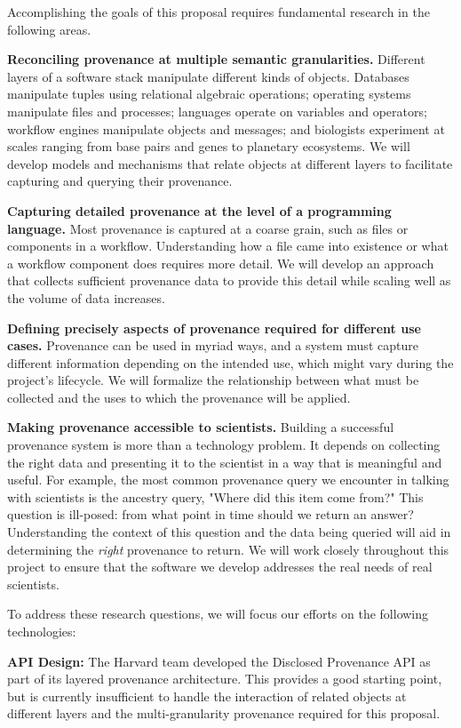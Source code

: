 \documentclass[10pt]{article}
\begin{document}
Accomplishing the goals of this proposal requires fundamental research
in the following areas.

\textbf{Reconciling provenance at multiple semantic granularities.}
Different layers of a software stack manipulate different kinds of
objects.  Databases manipulate tuples using relational algebraic
operations; operating systems manipulate files and processes;
languages operate on variables and operators; workflow engines
manipulate objects and messages; and biologists experiment at scales
ranging from base pairs and genes to planetary ecosystems.  We will
develop models and mechanisms that relate objects at different
layers to facilitate capturing and querying their provenance.

\textbf{Capturing detailed provenance at the level of a programming
language.}  Most provenance is captured at a coarse grain, such as
files or components in a workflow.  Understanding how a file came
into existence or what a workflow component does requires more
detail.  We will develop an approach that collects sufficient
provenance data to provide this detail while scaling well as the
volume of data increases.

\textbf{Defining precisely aspects of provenance required
for different use cases.}
Provenance can be used in myriad ways, and a system must capture
different information depending on the intended use, which might
vary during the project's lifecycle.  We will formalize the
relationship between what must be collected and the uses to which
the provenance will be applied.

\textbf{Making provenance accessible to scientists.}   Building a
successful provenance system is more than a technology problem.  It
depends on collecting the right data and presenting it to the
scientist in a way that is meaningful and useful.  For example, the
most common provenance query we encounter in talking with scientists
is the ancestry query, "Where did this item come from?" This question
is ill-posed: from what point in time should we return an answer?
Understanding the context of this question and the data being queried
will aid in determining the \emph{right} provenance to return.  We
will work closely throughout this project to ensure that the software
we develop addresses the real needs of real scientists.

To address these research questions, we will focus our efforts on the following technologies:

\textbf{API Design: }The Harvard team developed the Disclosed Provenance
API as part of its layered provenance architecture.  This provides a good
starting point, but is currently insufficient to handle the interaction
of related objects at different layers and the multi-granularity provenance
required for this proposal.
\end{document}
